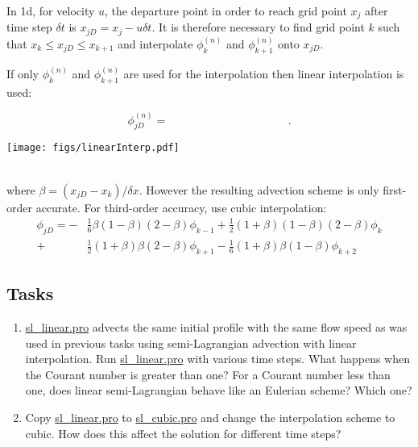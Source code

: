 In 1d, for velocity $u$, the departure point in order to reach grid point $x_j$ after time step $\delta t$ is $x_{jD}=x_j-u\delta t$. It is therefore necessary to find grid point $k$ such that $x_k \le x_{jD} \le x_{k+1}$ and interpolate $\phi^{(n)}_k$ and $\phi^{(n)}_{k+1}$ onto $x_{jD}$. 

If only $\phi^{(n)}_k$ and $\phi^{(n)}_{k+1}$ are used for the interpolation then linear interpolation is used:\\
\begin{minipage}{0.49\linewidth}
\begin{equation*}
\phi^{(n)}_{jD} = ~~~~~~~~~~~~~~~~~~~~~~~~~~~~~~~~~~~~~~~~~~~~~~~~.
\end{equation*}
\end{minipage}
\begin{minipage}{0.49\linewidth}
\texttt{[image: figs/linearInterp.pdf]}
\end{minipage}\\
where $\beta = (x_{jD} - x_{k})/\delta x$. 
However the resulting advection scheme is only first-order accurate. For third-order accuracy, use cubic interpolation:
\begin{align}
\phi_{jD} = -& \frac{1}{6}\beta(1-\beta)(2-\beta)\phi_{k-1}
             + \frac{1}{2}(1+\beta)(1-\beta)(2-\beta)\phi_k \\
            +& \frac{1}{2}(1+\beta)\beta(2-\beta)\phi_{k+1}
             - \frac{1}{6}(1+\beta)\beta(1-\beta)\phi_{k+2}
\end{align}

\subsection{Tasks}
\begin{enumerate}
\item \url{sl_linear.pro} advects the same initial profile with the same flow speed as was used in previous tasks using semi-Lagrangian advection with linear interpolation. Run \url{sl_linear.pro} with various time steps. What happens when the Courant number is greater than one? For a Courant number less than one, does linear semi-Lagrangian behave like an Eulerian scheme? Which one?
\item Copy \url{sl_linear.pro} to \url{sl_cubic.pro} and change the interpolation scheme to cubic. How does this affect the solution for different time steps?
\end{enumerate}









